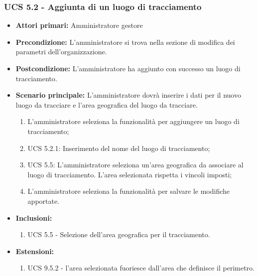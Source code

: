 \subsubsection{UCS 5.2 - Aggiunta di un luogo di tracciamento}%
\begin{itemize}
    \item \textbf{Attori primari:} Amministratore gestore
    \item \textbf{Precondizione:} L'amministratore si trova nella sezione di modifica dei parametri dell'organizzazione.
    \item \textbf{Postcondizione:} L'amministratore ha aggiunto con successo un luogo di tracciamento.
    \item \textbf{Scenario principale:} L'amministratore dovrà inserire i dati per il nuovo luogo da tracciare e l'area geografica del luogo da tracciare.
    \begin{enumerate}%
        \item L'amministratore seleziona la funzionalità per aggiungere un luogo di tracciamento;
        \item UCS 5.2.1: Inserimento del nome del luogo di tracciamento;
        \item UCS 5.5: L'amministratore seleziona un'area geografica da associare al luogo di tracciamento. L'area selezionata rispetta i vincoli imposti;
        \item L'amministratore seleziona la funzionalità per salvare le modifiche apportate.
    \end{enumerate} 
    \item \textbf{Inclusioni:}
    \begin{enumerate}
        \item UCS 5.5 - Selezione dell'area geografica per il tracciamento.
    \end{enumerate}
    \item \textbf{Estensioni:}
    \begin{enumerate}
        \item UCS 9.5.2 - l'area selezionata fuoriesce dall'area che definisce il perimetro.
    \end{enumerate}
\end{itemize}

